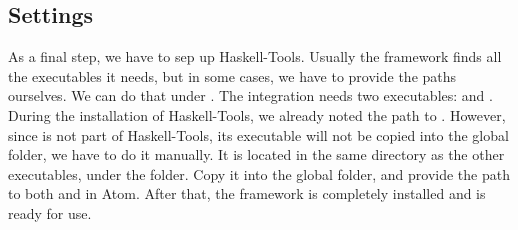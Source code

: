 \documentclass[main.tex]{subfiles}
\begin{document}
	
	\subsection{Settings}
	
	As a final step, we have to sep up Haskell-Tools. Usually the framework finds all the executables it needs, but in some cases, we have to provide the paths ourselves. We can do that under . The integration needs two executables:  and . During the installation of Haskell-Tools, we already noted the path to . However, since  is not part of Haskell-Tools, its executable will not be copied into the global  folder, we have to do it manually. It is located in the same directory as the other executables, under the  folder. Copy it into the global  folder, and provide the path to both  and  in Atom. After that, the framework is completely installed and is ready for use.
	
\end{document}
